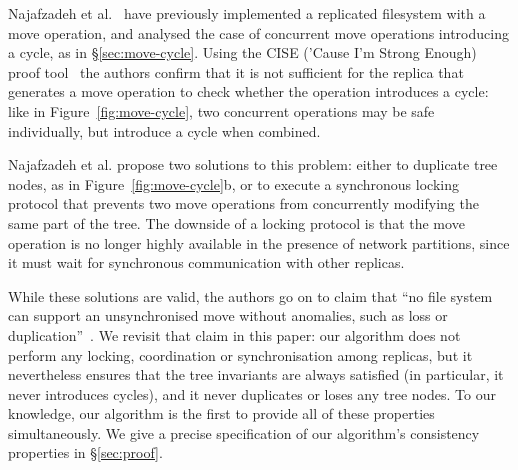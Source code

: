\documentclass[sigplan,anonymous]{acmart}
\begin{document}
Najafzadeh et al.~\cite{Najafzadeh:2017vk,Najafzadeh:2018bw} have previously implemented a replicated filesystem with a move operation, and analysed the case of concurrent move operations introducing a cycle, as in \S\ref{sec:move-cycle}.
Using the CISE ('Cause I'm Strong Enough) proof tool~\cite{DBLP:conf/popl/GotsmanYFNS16,Najafzadeh:2016fi} the authors confirm that it is not sufficient for the replica that generates a move operation to check whether the operation introduces a cycle: like in Figure~\ref{fig:move-cycle}, two concurrent operations may be safe individually, but introduce a cycle when combined.

Najafzadeh et al. propose two solutions to this problem: either to duplicate tree nodes, as in Figure~\ref{fig:move-cycle}b, or to execute a synchronous locking protocol that prevents two move operations from concurrently modifying the same part of the tree.
The downside of a locking protocol is that the move operation is no longer highly available in the presence of network partitions, since it must wait for synchronous communication with other replicas.

While these solutions are valid, the authors go on to claim that ``no file system can support an unsynchronised move without anomalies, such as loss or duplication''~\cite{Najafzadeh:2018bw}.
We revisit that claim in this paper: our algorithm does not perform any locking, coordination or synchronisation among replicas, but it nevertheless ensures that the tree invariants are always satisfied (in particular, it never introduces cycles), and it never duplicates or loses any tree nodes.
To our knowledge, our algorithm is the first to provide all of these properties simultaneously.
We give a precise specification of our algorithm's consistency properties in \S\ref{sec:proof}.
\end{document}
